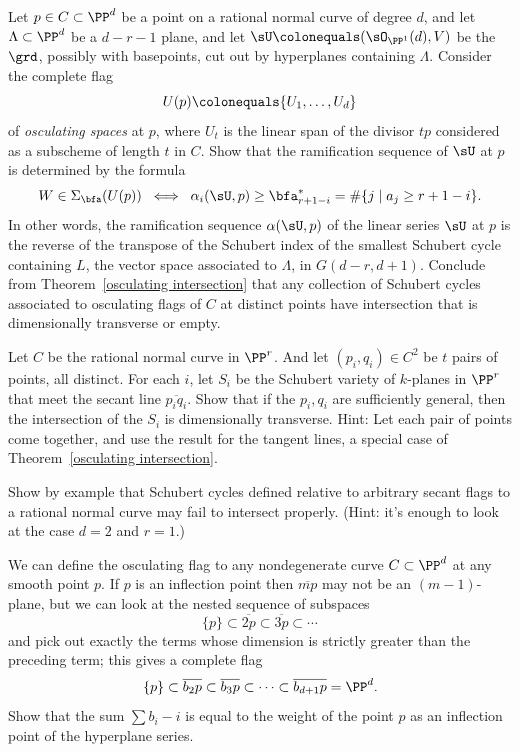 \begin{exercise}\label{osculating
planes}
Let $p\in C\subset \PP^{d}$ be a point on a rational normal curve of
degree $d$, and
let $\Lambda\subset \PP^{d}$ be a $d-r-1$ plane, and let  $\sU
\colonequals (\sO_{\PP^{1}}(d), V)$
be
the  $\grd$,  possibly with basepoints, cut out by hyperplanes containing
$\Lambda$.
Consider the complete flag
$$
U(p) \colonequals  \{U_{1}, \dots, U_{d}\}
$$
of \emph{osculating spaces} at $p$, where $U_{t}$ is the linear span of
%
the divisor $tp$ considered
as a subscheme of length $t$ in $C$. Show that the ramification sequence
of $\sU$ at $p$
is determined by the formula
$$
W \in \Sigma_{\bfa}(U(p))
\; \iff \; \alpha_i(\sU, p) \geq \bfa^*_{r+1-i} = \#\{j\mid a_j\geq
r+1-i\}.
$$
In other words, the ramification sequence $\alpha(\sU, p)$ of the linear
series $\sU$ at $p$ is the reverse of the transpose of the Schubert
index of the smallest Schubert cycle containing $L$, the vector
space associated to $\Lambda$, in  $G(d-r, d+1)$. Conclude from
Theorem~\ref{osculating intersection}
that any collection of Schubert cycles associated to osculating flags
of $C$ at distinct points have intersection
that is dimensionally transverse or empty.
\end{exercise}

\begin{exercise}\label{independent secants 0}
Let $C$ be the rational normal curve in $\PP^{r}$. And let $(p_{i},
q_{i})\in  C^{2}$ be $t$ pairs of points, all distinct.
For each $i$, let $S_{i}$ be the Schubert variety of $k$-planes in
$\PP^{r}$ that meet the secant line
$\overline{p_{i}q_{i}}$. Show that if the $p_{i}, q_{i}$ are sufficiently
general, then the intersection
of the $S_{i}$ is dimensionally transverse. Hint: Let each pair of points
come together, and use the result
for the tangent lines, a special case of Theorem~\ref{osculating
intersection}.
\end{exercise}

\begin{exercise}\label{only general secants}
Show by example that Schubert cycles defined relative to arbitrary secant
flags to a rational normal curve may fail to intersect properly. (Hint:
it's enough to look at the case $d=2$ and $r=1$.)
\end{exercise}

\begin{exercise}
We can define the osculating flag to any nondegenerate curve $C \subset
\PP^d$ at any smooth point $p$. If $p$ is an inflection point then
$\overline{mp}$ may not be an $(m-1)$-plane, but we can look at the
nested sequence of subspaces
$$
\{p\} \subset \overline{2p} \subset \overline{3p} \subset \cdots
$$
and pick out exactly the terms whose dimension is strictly greater than
the preceding term; this gives a complete flag
$$
\{p\} \subset \overline{b_2p} \subset \overline{b_3p} \subset \dots
\subset \overline{b_{d+1}p} = \PP^d
.
$$
Show that the sum $\sum b_i - i$ is equal to the weight of the point $p$
as an inflection point of the hyperplane series.
\end{exercise}


